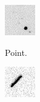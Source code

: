 \begin{figure}[!h]
   \centering
    \begin{subfigure}{.2\textwidth}
        \centering
        \includegraphics[width=\textwidth]{images/point.png}
        \label{fig:fitsreal3a}
        \caption{Point.}
    \end{subfigure}
    \begin{subfigure}{.2\textwidth}
        \centering
        \includegraphics[width=\textwidth]{images/line2.png}

\end{subfigure}
\end{figure}
